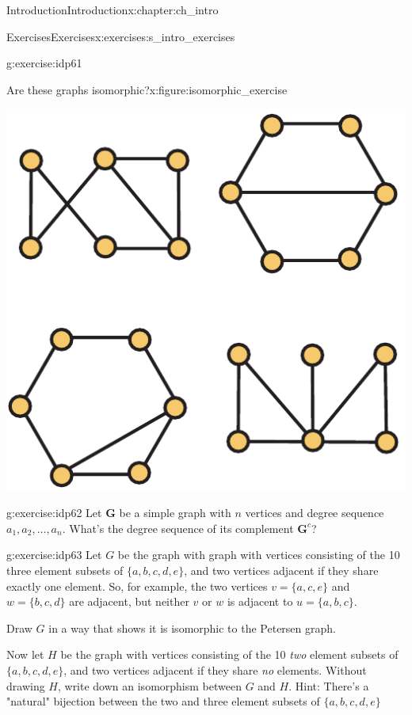 \documentclass[oneside,10pt,]{book}
\numberwithin{equation}{section}
\newcommand{\bfG}{\mathbf{G}}
\begin{document}
\begin{chapterptx}{Introduction}{}{Introduction}{}{}{x:chapter:ch_intro}
\begin{exercises-section}{Exercises}{}{Exercises}{}{}{x:exercises:s_intro_exercises}
\begin{divisionexercise}{3}{}{}{g:exercise:idp61}
\begin{figureptx}{Are these graphs isomorphic?}{x:figure:isomorphic_exercise}{}%
\begin{image}{0.225}{0.55}{0.225}%
\includegraphics[width=\linewidth]{images/isomorphic_ex}
\end{image}%
\tcblower
\end{figureptx}%
\end{divisionexercise}%
\begin{divisionexercise}{4}{}{}{g:exercise:idp62}%
Let \(\bfG\) be a simple graph with \(n\) vertices and degree sequence \(a_1,a_2,\dots,a_n\).  What's the degree sequence of its complement \(\bfG^c\)?%
\end{divisionexercise}%
\begin{divisionexercise}{5}{}{}{g:exercise:idp63}%
Let \(G\) be the graph with graph with vertices consisting of the 10 three element subsets of \(\{a,b,c,d,e\}\), and two vertices adjacent if they share exactly one element.  So, for example, the two vertices \(v=\{a,c,e\}\) and \(w=\{b,c,d\}\) are adjacent, but neither \(v\) or \(w\) is adjacent to \(u=\{a,b,c\}\).%
\par
Draw \(G\) in a way that shows it is isomorphic to the Petersen graph.%
\par
Now let \(H\) be the graph with vertices consisting of the 10 \emph{two} element subsets of \(\{a,b,c,d,e\}\), and two vertices adjacent if they share \emph{no} elements.  Without drawing \(H\), write down an isomorphism between \(G\) and \(H\).  Hint: There's a "natural" bijection between the two and three element subsets of \(\{a,b,c,d,e\}\)%

\end{divisionexercise}
\end{exercises-section}
\end{chapterptx}
\end{document}
